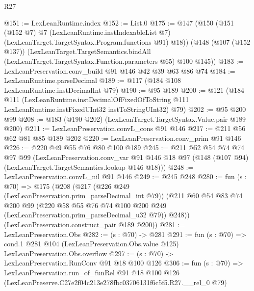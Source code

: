\begin{lexlean}{R27}
\begin{coremodule}
@151 := LexLeanRuntime.index
@152 := List.{0}
@175 := @147
    (@150
      (@151
        (@152 @7)
        @7
        (LexLeanRuntime.instIndexableList @7)
        (LexLeanTarget.TargetSyntax.Program.functions @91)
        @18))
    (@148
      (@107 (@152 @137))
      (LexLeanTarget.TargetSemantics.bindAll
        (LexLeanTarget.TargetSyntax.Function.parameters @65)
        @100
        @145))
@183 := LexLeanPreservation.conv_build @91 @146 @42 @39 @63 @86 @74
@184 := LexLeanRuntime.parseDecimal
@189 := @117 (@184 @108 LexLeanRuntime.instDecimalInt @79)
@190 := @95 @189
@200 := @121
    (@184
      @111
      (LexLeanRuntime.instDecimalOfFixedOfToString
        @111
        LexLeanRuntime.instFixedUInt32
        instToStringUInt32)
      @79)
@202 := @95 @200 @99
@208 := @183 (@190 @202) (LexLeanTarget.TargetSyntax.Value.pair @189 @200)
@211 := LexLeanPreservation.convL_cons @91 @146
@217 := @211 @56 @62 @81 @85 @189 @202
@220 := LexLeanPreservation.conv_prim @91 @146
@226 := @220 @49 @55 @76 @80 @100 @189
@245 := @211
    @52
    @54
    @74
    @74
    @97
    @99
    (LexLeanPreservation.conv_var
      @91
      @146
      @18
      @97
      (@148 (@107 @94) (LexLeanTarget.TargetSemantics.lookup @146 @18)))
@248 := LexLeanPreservation.convL_nil @91 @146
@249 := @245 @248
@280 := fun (s : @70) =>
  @175
    (@208
      (@217
        (@226 @249 (LexLeanPreservation.prim_parseDecimal_int @79))
        (@211
          @60
          @54
          @83
          @74
          @200
          @99
          (@220 @58 @55 @76 @74 @100 @200 @249 (LexLeanPreservation.prim_parseDecimal_u32 @79))
          @248))
      (LexLeanPreservation.construct_pair @189 @200))
@281 := LexLeanPreservation.Obs
@282 := (s : @70) -> @281
@291 := fun (s : @70) =>
  cond.{1} @281 @104 (LexLeanPreservation.Obs.value @125) LexLeanPreservation.Obs.overflow
@297 := (s : @70) -> LexLeanPreservation.RunConv @91 @18 @100 @126
@306 := fun (s : @70) =>
  LexLeanPreservation.run_of_funRel
    @91
    @18
    @100
    @126
    (LexLeanPreserve.C27e2f04c213e278fbc03706131f6c5f5.R27.__rel_0 @79)
\end{coremodule}
\end{lexlean}
